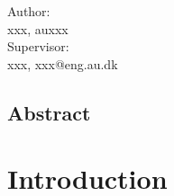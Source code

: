 \documentclass[
11pt, %
a4paper, %
oneside, %
headinclude,footinclude, %
BCOR5mm, %
]{report}
\begin{document}
\begin{titlepage}
\begin{flushleft}
	{\normalfont\normalsize \color{MidnightBlue}
	Author: \\
	xxx, auxxx \\
	\vspace{1cm}
	Supervisor: \\
	xxx, xxx@eng.au.dk
	}
\end{flushleft} 
\vspace{-0.5cm}
\vfill
\begin{flushleft}
\end{flushleft}
\end{titlepage}

\newpage
\section*{Abstract}

\newpage %


\setcounter{tocdepth}{1} %

\tableofcontents %

\listoffigures %

\listoftables %

%

\chapter{Introduction}

\end{document}
